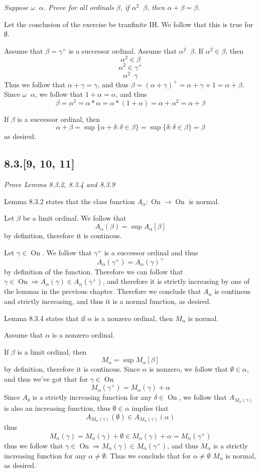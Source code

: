 \documentclass[11pt,oneside,titlepage]{book}
\DeclareMathOperator \ra {\Rightarrow}
\DeclareMathOperator \On {On}
\DeclareMathOperator \ineq {\underline{\in}}
\newcommand{\set}[1]{\{ #1 \}}
\begin{document}
\textit{Suppose $\omega \ineq \alpha$. Prove for all ordinals $\beta$, if
  $\alpha^2 \ineq \beta$, then $\alpha + \beta = \beta$.}

Let the conclusion of the exercise be tranfinite IH.
We follow that this is true for $\emptyset$.

Assume that $\beta = \gamma^+$ is a successor ordinal. Assume that $\alpha^2 \ineq \beta$.
If $\alpha^2 \in \beta$, then
$$\alpha^2 \in \beta$$
$$\alpha^2 \in \gamma^+$$
$$\alpha^2 \ineq \gamma$$
Thus we follow that $\alpha + \gamma = \gamma$, and thus $\beta = (\alpha + \gamma)^+ =
\alpha + \gamma + 1 = \alpha + \beta$.
Since $\omega \ineq \alpha$, we follow that $1 + \alpha = \alpha$, and thus
$$\beta = \alpha^2 = \alpha * \alpha = \alpha * (1 + \alpha) =
\alpha + \alpha^2  = \alpha + \beta$$

If $\beta$ is a successor ordinal, then
$$\alpha + \beta = \sup\set{\alpha + \delta: \delta \in \beta} =
\sup\set{\delta: \delta \in \beta} = \beta$$
as desired.

\subsection*{8.3.[9, 10, 11]}

\textit{Prove Lemma 8.3.2, 8.3.4 and 8.3.9}

Lemma 8.3.2 states that the class function $A_\alpha: \On \to \On$ is normal.

Let $\beta$ be a limit ordinal. We follow that
$$A_\alpha(\beta) = \sup A_\alpha[\beta]$$
by definition, therefore it is continous.

Let $\gamma \in \On$. We follow that $\gamma^+$ is a successor ordinal and thus
$$A_\alpha(\gamma^+) = A_\alpha(\gamma)^+$$
by definition of the function. Therefore we can follow that $\gamma \in \On \ra
A_\alpha(\gamma) \in A_\alpha(\gamma^+)$, and therefore it is strictly increasing
by one of the lemmas in the previous chapter. Therefore we conclude that
$A_\alpha$ is continous and strictly increasing, and thus it is a normal function,
as desired.

Lemma 8.3.4 states that if $\alpha$ is a nonzero ordinal, then $M_\alpha$ is normal.

Assume that $\alpha$ is a nonzero ordinal.

If $\beta$ is a limit ordinal, then
$$M_\alpha = \sup{M_\alpha[\beta]}$$
by definition, therefore it is continous. Since $\alpha$ is nonzero, we follow that
$\emptyset \in \alpha$, and thus we've got that for $\gamma \in \On$
$$M_\alpha(\gamma^+) = M_\alpha(\gamma) + \alpha$$
Since $A_\delta$ is a strictly increasing function for any $\delta \in \On$, we follow that
$A_{M_\alpha(\gamma)}$ is also an increasing function, thus $\emptyset \in \alpha$
implies that
$$A_{M_\alpha(\gamma)}(\emptyset) \in A_{M_\alpha(\gamma)}(\alpha)$$
thus
$$M_\alpha(\gamma) = M_\alpha(\gamma) + \emptyset \in
M_\alpha(\gamma) + \alpha = M_\alpha(\gamma^+)$$
thus we follow that $\gamma \in \On \ra M_\alpha(\gamma) \in M_\alpha(\gamma^+)$, and
thus $M_\alpha$ is a strictly increasing function for any $\alpha \neq \emptyset$.
Thus we conclude that for $\alpha \neq \emptyset$  $M_\alpha$ is normal, as desired.
\end{document}
